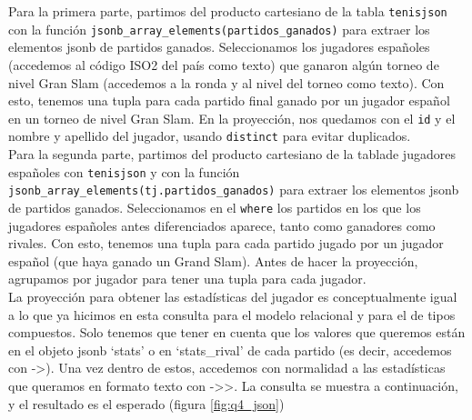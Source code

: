 Para la primera parte, partimos del producto cartesiano de la tabla \texttt{tenisjson} con la función \texttt{jsonb\_array\_elements(partidos\_ganados)} para extraer los elementos jsonb de partidos ganados. Seleccionamos los jugadores españoles (accedemos al código ISO2 del país como texto) que ganaron algún torneo de nivel Gran Slam (accedemos a la ronda y al nivel del torneo como texto). Con esto, tenemos una tupla para cada partido final ganado por un jugador español en un torneo de nivel Gran Slam. En la proyección, nos quedamos con el \texttt{id} y el nombre y apellido del jugador, usando \texttt{distinct} para evitar duplicados. \\

Para la segunda parte, partimos del producto cartesiano de la tablade jugadores españoles con \texttt{tenisjson} y con la función \texttt{jsonb\_array\_elements(tj.partidos\_ganados)} para extraer los elementos jsonb de partidos ganados. Seleccionamos en el \texttt{where} los partidos en los que los jugadores españoles antes diferenciados aparece, tanto como ganadores como rivales. Con esto, tenemos una tupla para cada partido jugado por un jugador español (que haya ganado un Grand Slam). Antes de hacer la proyección, agrupamos por jugador para tener una tupla para cada jugador. \\

La proyección para obtener las estadísticas del jugador es conceptualmente igual a lo que ya hicimos en esta consulta para el modelo relacional y para el de tipos compuestos. Solo tenemos que tener en cuenta que los valores que queremos están en el objeto jsonb `stats' o en `stats\_rival' de cada partido (es decir, accedemos con ->). Una vez dentro de estos, accedemos con normalidad a las estadísticas que queramos en formato texto con ->>. La consulta se muestra a continuación, y el resultado es el esperado (figura \ref{fig:q4_json})

